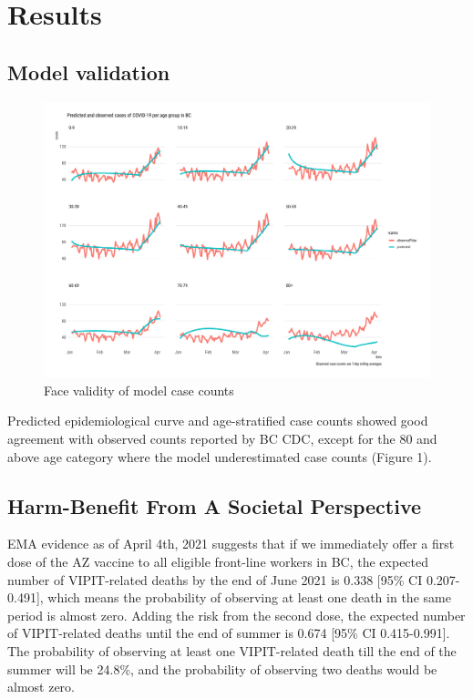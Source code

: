 \documentclass[]{interact}
\theoremstyle{plain}%
\theoremstyle{definition}
\theoremstyle{remark}
\begin{document}
\hypertarget{results}{%
\section{Results}\label{results}}

\hypertarget{model-validation}{%
\subsection{Model validation}\label{model-validation}}

\begin{figure}

{\centering \includegraphics[width=1\linewidth]{../figures/fig-validation} 

}

\caption{Face validity of model case counts}\label{fig:figValidation}
\end{figure}

Predicted epidemiological curve and age-stratified case counts showed
good agreement with observed counts reported by BC CDC, except for the
80 and above age category where the model underestimated case counts
(Figure 1).

\hypertarget{harm-benefit-from-a-societal-perspective}{%
\subsection{Harm-Benefit From A Societal
Perspective}\label{harm-benefit-from-a-societal-perspective}}

EMA evidence as of April 4th, 2021 suggests that if we immediately offer
a first dose of the AZ vaccine to all eligible front-line workers in BC,
the expected number of VIPIT-related deaths by the end of June 2021 is
0.338 {[}95\% CI 0.207-0.491{]}, which means the probability of
observing at least one death in the same period is almost zero. Adding
the risk from the second dose, the expected number of VIPIT-related
deaths until the end of summer is 0.674 {[}95\% CI 0.415-0.991{]}. The
probability of observing at least one VIPIT-related death till the end
of the summer will be 24.8\%, and the probability of observing two
deaths would be almost zero.
\end{document}
